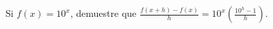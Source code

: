 \item Si $f(x) = 10^x$, demuestre que $\displaystyle \frac{f(x + h) - f(x)}{h} = 10^x \left( \frac{10^h - 1}{h} \right)$.
